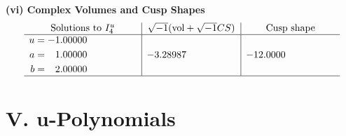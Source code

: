 \documentclass[1p]{elsarticle_modified}
\theoremstyle{definition}
\newcommand{\I}{\sqrt{-1}}
\begin{document}
\newpage\flushleft \textbf{(vi) Complex Volumes and Cusp Shapes}
$$\begin{array}{c|c|c}  
\text{Solutions to }I^u_{4}& \I (\text{vol} + \sqrt{-1}CS) & \text{Cusp shape}\\
 \hline 
\begin{aligned}
u &= -1.00000\phantom{ +0.000000I} \\
a &= \phantom{-}1.00000\phantom{ +0.000000I} \\
b &= \phantom{-}2.00000\phantom{ +0.000000I}\end{aligned}
 & -3.28987\phantom{ +0.000000I} & -12.0000\phantom{ +0.000000I}\\
 \hline 
 \end{array}$$\newpage
\newpage\renewcommand{\arraystretch}{1}
\centering \section*{ V. u-Polynomials}
\end{document}

